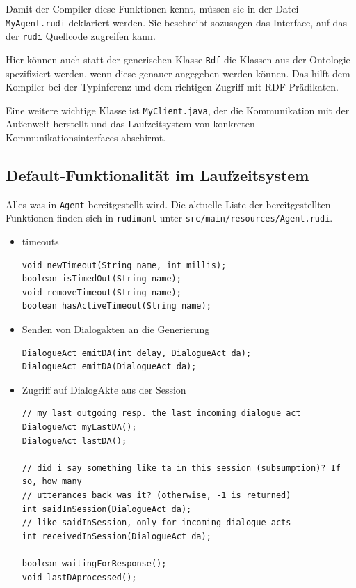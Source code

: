 Damit der Compiler diese Funktionen kennt, müssen sie in der Datei
\texttt{MyAgent.rudi} deklariert werden. Sie beschreibt sozusagen das
Interface, auf das der \texttt{rudi} Quellcode zugreifen kann.

Hier können auch statt der generischen Klasse \texttt{Rdf} die Klassen aus der
Ontologie spezifiziert werden, wenn diese genauer angegeben werden können. Das
hilft dem Kompiler bei der Typinferenz und dem richtigen Zugriff mit
RDF-Prädikaten.

Eine weitere wichtige Klasse ist \texttt{MyClient.java}, der die Kommunikation
mit der Außenwelt herstellt und das Laufzeitsystem von konkreten
Kommunikationsinterfaces abschirmt.

\subsection{Default-Funktionalität im Laufzeitsystem}
Alles was in \texttt{Agent} bereitgestellt wird. Die aktuelle Liste der
bereitgestellten Funktionen finden sich in \texttt{rudimant} unter
\texttt{src/main/resources/Agent.rudi}.

\begin{itemize}
\item timeouts
\begin{verbatim}
void newTimeout(String name, int millis);
boolean isTimedOut(String name);
void removeTimeout(String name);
boolean hasActiveTimeout(String name);
\end{verbatim}
\item Senden von Dialogakten an die Generierung
\begin{verbatim}
DialogueAct emitDA(int delay, DialogueAct da);
DialogueAct emitDA(DialogueAct da);
\end{verbatim}
\item Zugriff auf DialogAkte aus der Session
\begin{verbatim}
// my last outgoing resp. the last incoming dialogue act
DialogueAct myLastDA();
DialogueAct lastDA();

// did i say something like ta in this session (subsumption)? If so, how many
// utterances back was it? (otherwise, -1 is returned)
int saidInSession(DialogueAct da);
// like saidInSession, only for incoming dialogue acts
int receivedInSession(DialogueAct da);

boolean waitingForResponse();
void lastDAprocessed();
\end{verbatim}
\end{itemize}

